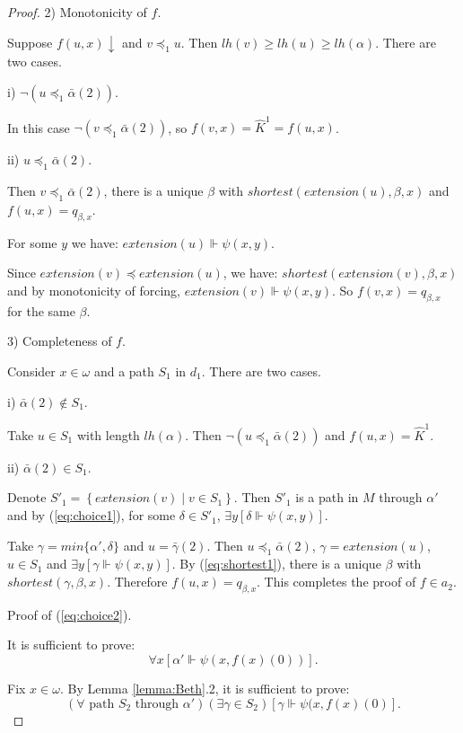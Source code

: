 \documentclass{asl}
\theoremstyle{definition}
\begin{document}
\begin{proof}
2) Monotonicity of $f$.

Suppose $f(u,x)\downarrow$ and $v\preccurlyeq_1 u$. Then $lh(v)\geqslant lh(u)\geqslant lh(\alpha)$. There are two cases.

i) $\neg(u\preccurlyeq_1\bar{\alpha}(2))$.

In this case $\neg(v\preccurlyeq_1\bar{\alpha}(2))$, so $f(v,x)=\widehat{K}^1=f(u,x)$.

ii) $u\preccurlyeq_1\bar{\alpha}(2)$.

Then $v\preccurlyeq_1\bar{\alpha}(2)$, there is a unique $\beta$ with $shortest(extension(u),\beta,x)$ and $f(u,x)=q_{\beta,x}$.

For some $y$ we have:  $extension(u)\Vdash \psi(x,y)$. 

Since $extension(v)\preccurlyeq extension(u)$, we have: $shortest(extension(v),\beta,x)$ and by monotonicity of forcing, $extension(v)\Vdash \psi(x,y)$. So $f(v,x)=q_{\beta, x}$ for the same $\beta$.

3) Completeness of $f$.

Consider $x\in \omega$ and a path $S_1$ in $d_1$. There are two cases.

i) $\bar{\alpha}(2)\notin S_1$.

Take $u\in S_1$ with length $lh(\alpha)$. Then $\neg(u\preccurlyeq_1\bar{\alpha}(2))$ and $f(u,x)=\widehat{K}^1$.

ii) $\bar{\alpha}(2)\in S_1$.

Denote $S'_1=\left\lbrace extension(v)\mid v\in S_1\right\rbrace $. Then $S'_1$ is a path in $M$ through $\alpha'$ and by (\ref{eq:choice1}), for some $\delta\in S'_1$, $\exists y\left[\delta\Vdash \psi(x,y)\right] $. 
\smallskip

Take $\gamma=min\{\alpha',\delta\}$ and $u=\bar{\gamma}(2)$. Then $u\preccurlyeq_1\bar{\alpha}(2)$, $\gamma=extension(u)$, $u\in S_1$ and $\exists y\left[\gamma\Vdash \psi(x,y)\right] $. By (\ref{eq:shortest1}), there is a unique $\beta$ with $shortest(\gamma,\beta,x)$. Therefore $f(u,x)=q_{\beta, x}$. This completes the proof of $f\in a_2$.
\medskip
\begin{center}
Proof of (\ref{eq:choice2}). 
\end{center}

It is sufficient to prove:
\[ \forall x\left[\alpha'\Vdash \psi(x,f(x)(0))\right].\]

Fix $x\in \omega$. By Lemma \ref{lemma:Beth}.2, it is sufficient to prove:
\[(\forall \text{ path }S_2\text{ through }\alpha')(\exists \gamma\in S_2)\left[\gamma\Vdash \psi(x,f(x)(0) \right] . \]


\end{proof}
\end{document}
